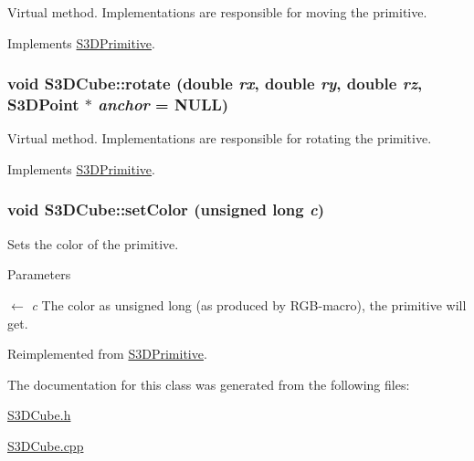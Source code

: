 Virtual method. Implementations are responsible for moving the primitive. 



Implements \hyperlink{class_s3_d_primitive_a73a178ec2e1aa8e95f01baf0552724a9}{S3DPrimitive}.

\hypertarget{class_s3_d_cube_a2e574649ca6ddd805c5ecdb7932f3ac1}{
\subsubsection[{rotate}]{\setlength{\rightskip}{0pt plus 5cm}void S3DCube::rotate (double {\em rx}, \/  double {\em ry}, \/  double {\em rz}, \/  {\bf S3DPoint} $\ast$ {\em anchor} = {\ttfamily NULL})}}
\label{class_s3_d_cube_a2e574649ca6ddd805c5ecdb7932f3ac1}


Virtual method. Implementations are responsible for rotating the primitive. 



Implements \hyperlink{class_s3_d_primitive_a23eb36b6bd48643e8f7be4b950592d9e}{S3DPrimitive}.

\hypertarget{class_s3_d_cube_a9c48875a16cc0ace3a3092e98663b785}{
\subsubsection[{setColor}]{\setlength{\rightskip}{0pt plus 5cm}void S3DCube::setColor (unsigned long {\em c})}}
\label{class_s3_d_cube_a9c48875a16cc0ace3a3092e98663b785}


Sets the color of the primitive. 


\begin{DoxyParams}{Parameters}
\item[\mbox{$\leftarrow$} {\em c}]The color as unsigned long (as produced by RGB-\/macro), the primitive will get. \end{DoxyParams}


Reimplemented from \hyperlink{class_s3_d_primitive_a1c8f036193987522bdfb6a49b9b74000}{S3DPrimitive}.



The documentation for this class was generated from the following files:\begin{DoxyCompactItemize}
\item 
\hyperlink{_s3_d_cube_8h}{S3DCube.h}\item 
\hyperlink{_s3_d_cube_8cpp}{S3DCube.cpp}\end{DoxyCompactItemize}
